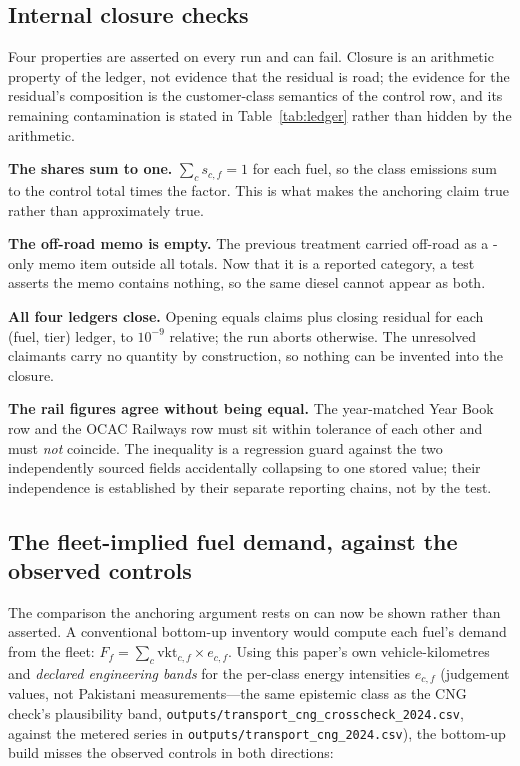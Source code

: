 \subsection{Internal closure checks}

Four properties are asserted on every run and can fail. Closure is an arithmetic property
of the ledger, not evidence that the residual is road; the evidence for the residual's
composition is the customer-class semantics of the control row, and its remaining
contamination is stated in Table~\ref{tab:ledger} rather than hidden by the arithmetic.

\textbf{The shares sum to one.} $\sum_c s_{c,f} = 1$ for each fuel, so the class emissions sum
to the control total times the factor. This is what makes the anchoring claim true rather than
approximately true.

\textbf{The off-road memo is empty.} The previous treatment carried off-road as a \COtwo{}-only
memo item outside all totals. Now that it is a reported category, a test asserts the memo
contains nothing, so the same diesel cannot appear as both.

\textbf{All four ledgers close.} Opening equals claims plus closing residual for each
(fuel, tier) ledger, to $10^{-9}$ relative; the run aborts otherwise. The unresolved
claimants carry no quantity by construction, so nothing can be invented into the closure.

\textbf{The rail figures agree without being equal.} The year-matched Year Book row and
the OCAC Railways row must sit within tolerance of each other and must \emph{not}
coincide. The inequality is a regression guard against the two independently sourced
fields accidentally collapsing to one stored value; their independence is established by
their separate reporting chains, not by the test.

\subsection{The fleet-implied fuel demand, against the observed controls}
\label{sec:fuelgap}

The comparison the anchoring argument rests on can now be shown rather than asserted. A
conventional bottom-up inventory would compute each fuel's demand from the fleet:
$F_f = \sum_c \mathrm{vkt}_{c,f} \times e_{c,f}$. Using this paper's own
vehicle-kilometres and \emph{declared engineering bands} for the per-class energy
intensities $e_{c,f}$ (judgement values, not Pakistani measurements---the same epistemic
class as the CNG check's plausibility band,
\texttt{outputs/transport\_\allowbreak cng\_\allowbreak crosscheck\_\allowbreak 2024.csv},
against the metered series in
\texttt{outputs/transport\_\allowbreak cng\_\allowbreak 2024.csv}), the bottom-up build
misses the observed controls in both directions:

